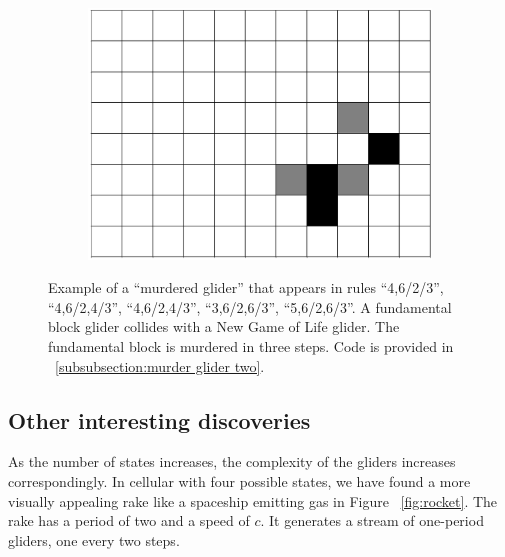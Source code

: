 \documentclass[12pt]{article}
\numberwithin{figure}{section} %
\begin{document}
\begin{figure}[htbp]
\begin{subfigure}{0.23\textwidth}
     		\subcaption{}
   	\end{subfigure}
        	\begin{subfigure}{0.23\textwidth}
     		\centering
     		\includegraphics[width=\linewidth]{Section4/33.7}
     		\subcaption{}
   	\end{subfigure}
   	\caption[Another example of a "murdered glider"]{Example of a “murdered glider” that appears in rules “4,6/2/3”, “4,6/2,4/3”, “4,6/2,4/3”, “3,6/2,6/3”, “5,6/2,6/3”. A fundamental block glider collides with a New Game of Life glider. The fundamental block is murdered in three steps. Code is provided in ~\ref{subsubsection:murder glider two}. }
   	\label{fig:murder glider two}
\end{figure}
\subsection{Other interesting discoveries}
As the number of states increases, the complexity of the gliders increases correspondingly. In cellular with four possible states, we have found a more visually appealing rake like a spaceship emitting gas in Figure ~\ref{fig:rocket}. The rake has a period of two and a speed of $c$. It generates a stream of one-period gliders, one every two steps. 
\end{document}
